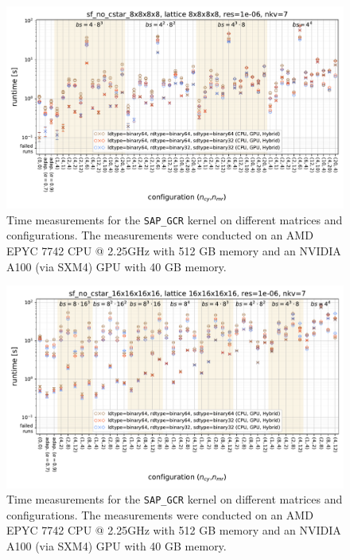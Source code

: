 \documentclass{article}
\theoremstyle{plain} %
\theoremstyle{convention} %
\theoremstyle{remark} %
\def\code#1{\texttt{#1}}
\numberwithin{equation}{section}
\begin{document}
\begin{figure}[htbp]
    \centering
    \includegraphics[width=1.0\textwidth]{plots/sap_gcr_sf_no_cstar_8x8x8x8_lattice_8x8x8x8_res=1e-06_nkv=7}
    \caption{Time measurements for the \code{SAP\_GCR} kernel on different matrices and configurations. The measurements were conducted on an AMD EPYC 7742 CPU @ 2.25GHz with 512 GB memory and an NVIDIA A100 (via SXM4) GPU with 40 GB memory.}
    \label{fig:sap_gcr0}
    \label{fig:sap_gcr_start}
    \label{fig:sap_gcr_sf_8x8x8x8}
\end{figure}

\begin{figure}[htbp]
    \centering
    \includegraphics[width=1.0\textwidth]{plots/sap_gcr_sf_no_cstar_16x16x16x16_lattice_16x16x16x16_res=1e-06_nkv=7}
    \caption{Time measurements for the \code{SAP\_GCR} kernel on different matrices and configurations. The measurements were conducted on an AMD EPYC 7742 CPU @ 2.25GHz with 512 GB memory and an NVIDIA A100 (via SXM4) GPU with 40 GB memory.}
    \label{fig:sap_gcr3}
    \label{fig:sap_gcr_sf_16x16x16x16}
\end{figure}
\end{document}

